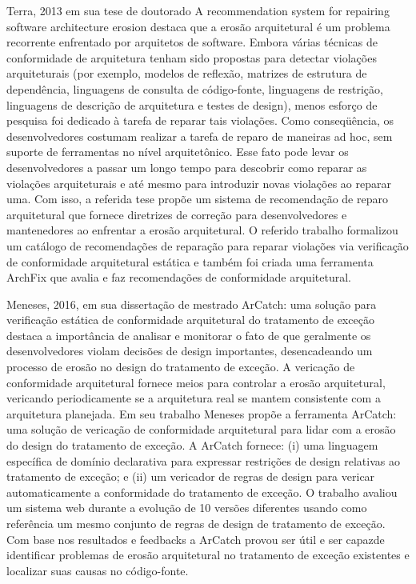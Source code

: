 \documentclass[
	12pt,				%
	openright,			%
	twoside,			%
	a4paper,			%
	english,			%
	french,				%
	spanish,			%
	brazil,				%
	]{abntex2}
\begin{document}
Terra, 2013 em sua tese de doutorado \textquotedbl{}A recommendation
system for repairing software architecture erosion\textquotedbl{}
destaca que a erosão arquitetural é um problema recorrente enfrentado
por arquitetos de software. Embora várias técnicas de conformidade
de arquitetura tenham sido propostas para detectar violações arquiteturais
(por exemplo, modelos de reflexão, matrizes de estrutura de dependência,
linguagens de consulta de código-fonte, linguagens de restrição, linguagens
de descrição de arquitetura e testes de design), menos esforço de
pesquisa foi dedicado à tarefa de reparar tais violações. Como conseqüência,
os desenvolvedores costumam realizar a tarefa de reparo de maneiras
ad hoc, sem suporte de ferramentas no nível arquitetônico. Esse fato
pode levar os desenvolvedores a passar um longo tempo para descobrir
como reparar as violações arquiteturais e até mesmo para introduzir
novas violações ao reparar uma. Com isso, a referida tese propõe um
sistema de recomendação de reparo arquitetural que fornece diretrizes
de correção para desenvolvedores e mantenedores ao enfrentar a erosão
arquitetural. O referido trabalho formalizou um catálogo de recomendações
de reparação para reparar violações via verificação de conformidade
arquitetural estática e também foi criada uma ferramenta ArchFix que
avalia e faz recomendações de conformidade arquitetural.

Meneses, 2016, em sua dissertação de mestrado \textquotedbl{}ArCatch:
uma solução para verificação estática de conformidade arquitetural
do tratamento de exceção\textquotedbl{} destaca a importância de analisar
e monitorar o fato de que geralmente os desenvolvedores violam decisões
de design importantes, desencadeando um processo de erosão no design
do tratamento de exceção. A vericação de conformidade arquitetural
fornece meios para controlar a erosão arquitetural, vericando periodicamente
se a arquitetura real se mantem consistente com a arquitetura planejada.
Em seu trabalho Meneses propõe a ferramenta ArCatch: uma solução de
vericação de conformidade arquitetural para lidar com a erosão do
design do tratamento de exceção. A ArCatch fornece: (i) uma linguagem
específica de domínio declarativa para expressar restrições de design
relativas ao tratamento de exceção; e (ii) um vericador de regras
de design para vericar automaticamente a conformidade do tratamento
de exceção. O trabalho avaliou um sistema web durante a evolução de
10 versões diferentes usando como referência um mesmo conjunto de
regras de design de tratamento de exceção. Com base nos resultados
e feedbacks a ArCatch provou ser útil e ser capazde identificar problemas
de erosão arquitetural no tratamento de exceção existentes e localizar
suas causas no código-fonte.
\end{document}

